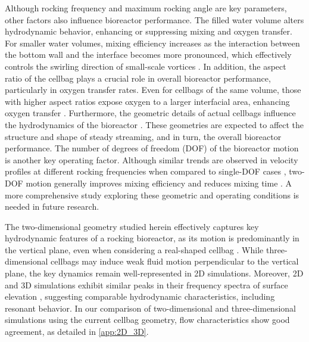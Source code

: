 \documentclass[final,3p,times,twocolumn,authoryear]{elsarticle}
\theoremstyle{definition}
\begin{document}
Although rocking frequency and maximum rocking angle are key parameters, other factors also influence bioreactor performance. The filled water volume alters hydrodynamic behavior, enhancing or suppressing mixing and oxygen transfer. For smaller water volumes, mixing efficiency increases as the interaction between the bottom wall and the interface becomes more pronounced, which effectively controls the swirling direction of small-scale vortices \citep{Watanabe2022}. In addition, the aspect ratio of the cellbag plays a crucial role in overall bioreactor performance, particularly in oxygen transfer rates. Even for cellbags of the same volume, those with higher aspect ratios expose oxygen to a larger interfacial area, enhancing oxygen transfer \citep{Svay2020,Seidel2022}. Furthermore, the geometric details of actual cellbags influence the hydrodynamics of the bioreactor \citep{Oncul2010,Junne2013,Bai2019a}. These geometries are expected to affect the structure and shape of steady streaming, and in turn, the overall bioreactor performance. The number of degrees of freedom (DOF) of the bioreactor motion is another key operating factor. Although similar trends are observed in velocity profiles at different rocking frequencies when compared to single-DOF cases \citep{Zhan2019}, two-DOF motion generally improves mixing efficiency and reduces mixing time \citep{Seidel2022}. A more comprehensive study exploring these geometric and operating conditions is needed in future research.

The two-dimensional geometry studied herein effectively captures key hydrodynamic features of a rocking bioreactor, as its motion is predominantly in the vertical plane, even when considering a real-shaped cellbag \citep{Zhan2019}. While three-dimensional cellbags may induce weak fluid motion perpendicular to the vertical plane, the key dynamics remain well-represented in 2D simulations. Moreover, 2D and 3D simulations exhibit similar peaks in their frequency spectra of surface elevation \citep{Rocca2000}, suggesting comparable hydrodynamic characteristics, including resonant behavior. In our comparison of two-dimensional and three-dimensional simulations using the current cellbag geometry, flow characteristics show good agreement, as detailed in \ref{app:2D_3D}.
\end{document}
